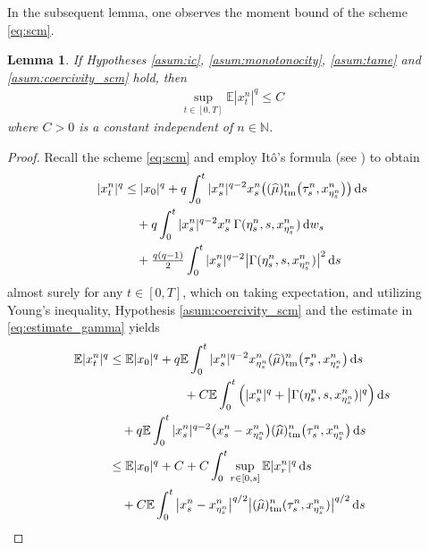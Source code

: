 \documentclass[reqno,  oneside, 12pt]{amsart}
\newtheorem{lemma}{Lemma}[section]
\newcommand{\E}{\mathbb E}
\begin{document}
In the subsequent lemma, one observes the moment bound of the  scheme \eqref{eq:scm}. 
\begin{lemma} \label{lem:scm_mb}
	If Hypotheses  \mbox{\normalfont  \ref{asum:ic}}, \mbox{\normalfont  \ref{asum:monotonocity}},      \mbox{\normalfont  \ref{asum:tame}} and {\mbox{\normalfont  \ref{asum:coercivity_scm}}} hold, then 
	\begin{align*}
		\sup_{ t\in[0,T]}\E|x_t^{n}|^{q}\leq  C
	\end{align*}
	where $C>0$ is a constant  independent  of $n\in\mathbb N$.
\end{lemma}
\begin{proof}
	Recall the  scheme   \eqref{eq:scm}  and  employ   It\^o's formula (see \cite[Theorem 94]{Situ2006}) to obtain
	\begin{align*} 
		|x_t^{n}|^{q}  
		&\leq
		|x_0|^{q}
		+{q}\int_{0}^{t}|x_s^{n}|^{{q}-2}x_s^{n}\big((\widehat\mu)_{\mathrm{tm}}^{n}\big(\tau^n_s,x_{\eta^n_s}^{n}\big)\big) 
		\,\mathrm{d}s \notag
		\\
		&\quad +{q}\int_{0}^{t}|x_s^{n}|^{{q}-2}x_s^{n}   \,\Gamma(\eta^n_s,s,x_{\eta^n_s}^{n})   \, \mathrm{d}w_s \notag
		\\
		&\quad +\tfrac{q(q-1)}{2}\int_{0}^{t}|x_s^{n}|^{{q}-2}\big|   \Gamma(\eta^n_s,s,x_{\eta^n_s}^{n}) \big|^2 \,\mathrm{d}s \notag
	\end{align*}
	almost surely for any $t\in[ 0, T]$, which on  taking expectation, and utilizing  Young's inequality,  Hypothesis   \ref{asum:coercivity_scm} and the estimate in \eqref{eq:estimate_gamma} yields  
	\begin{align}  %
		\E|x_t^{n}|^{q}  &\leq  \E|x_0|^{q}+{q}\E\int_{0}^{t} |x_{s}^{n}|^{{q}-2} x_{\eta^n_s}^{n}(\widehat\mu)_{\mathrm{tm}}^{n}\big(\tau^n_s,x_{\eta^n_s}^{n}\big) \,\mathrm{d}s \notag
		\\
		&\qquad\qquad\qquad+C\E\int_{0}^{t}\Big(|x_{s}^{n}|^{{q}}+\big|  \Gamma(\eta^n_s,s,x_{\eta^n_s}^{n})|^q\Big)\,\mathrm{d}s
		\notag
		\\
		&\quad+ q\E\int_{0}^{t}|x_{s}^{n}|^{{q}-2}\big(x_s^{n}-x_{\eta^n_s}^{n}\big)(\widehat\mu)_{\mathrm{tm}}^{n}\big(\tau^n_s,x_{\eta^n_s}^{n}\big)  \,\mathrm{d}s \notag
		\\
		&  \leq  \E|x_0|^{q}+C+C\int_0^t\sup_{ r\in[0,s]}\E|x_r^{n}|^{q}\,\mathrm{d}s \notag
		\\
		&\quad+ C\E\int_{0}^{t}\big|x_s^{n}-x_{\eta^n_s}^{n}\big|^{{q}/2}\big|(\widehat\mu)_{\mathrm{tm}}^{n}(\tau^n_s,x_{\eta^n_s}^{n})\big|^{{q}/2} \,\mathrm{d}s \notag

\end{align}
\end{proof}
\end{document}
